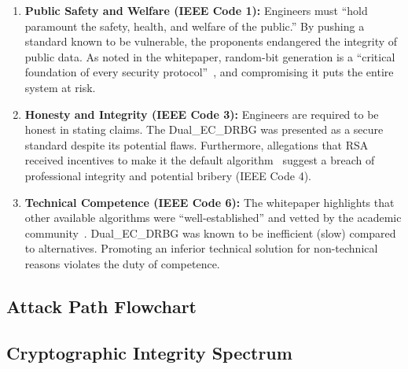 \documentclass[12pt,letterpaper]{article}
\begin{document}
\begin{enumerate}
    \item \textbf{Public Safety and Welfare (IEEE Code 1):} Engineers must ``hold paramount the safety, health, and welfare of the public.'' By pushing a standard known to be vulnerable, the proponents endangered the integrity of public data. As noted in the whitepaper, random-bit generation is a ``critical foundation of every security protocol''~\cite{entrust}, and compromising it puts the entire system at risk.
    
    \item \textbf{Honesty and Integrity (IEEE Code 3):} Engineers are required to be honest in stating claims. The Dual\_EC\_DRBG was presented as a secure standard despite its potential flaws. Furthermore, allegations that RSA received incentives to make it the default algorithm~\cite{entrust} suggest a breach of professional integrity and potential bribery (IEEE Code 4).
    
    \item \textbf{Technical Competence (IEEE Code 6):} The whitepaper highlights that other available algorithms were ``well-established'' and vetted by the academic community~\cite{entrust}. Dual\_EC\_DRBG was known to be inefficient (slow) compared to alternatives. Promoting an inferior technical solution for non-technical reasons violates the duty of competence.
\end{enumerate}

\subsection{Attack Path Flowchart}

\subsection{Cryptographic Integrity Spectrum}
    
    

\end{document}
